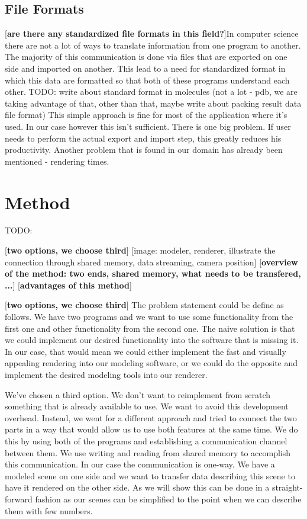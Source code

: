 \documentclass[
  digital, %
  table,   %
  nolof,     %
  nolot,     %
]{fithesis3}
\begin{document}
\section{File Formats}

[\textbf{are there any standardized file formats in this field?}]In computer science there are not a lot of ways to translate information from one program to another. The majority of this communication is done via files that are exported on one side and imported on another. This lead to a need for standardized format in which this data are formatted so that both of these programs understand each other. TODO: write about standard format in molecules (not a lot - pdb, we are taking advantage of that, other than that, maybe write about packing result data file format) This simple approach is fine for most of the application where it's used. In our case however this isn't sufficient. There is one big problem. If user needs to perform the actual export and import step, this greatly reduces his productivity. Another problem that is found in our domain has already been mentioned - rendering times.

\chapter{Method}
TODO:

[\textbf{two options, we choose third}]
[image: modeler, renderer, illustrate the connection through shared memory, data streaming, camera position]
[\textbf{overview of the method: two ends, shared memory, what needs to be transfered, ...}]
[\textbf{advantages of this method}]

[\textbf{two options, we choose third}]
The problem statement could be define as follows. We have two programs and we want to use some functionality from the first one and other functionality from the second one. The naive solution is that we could implement our desired functionality into the software that is missing it. In our case, that would mean we could either implement the fast and visually appealing rendering into our modeling software, or we could do the opposite and implement the desired modeling tools into our renderer.

We've chosen a third option. We don't want to reimplement from scratch something that is already available to use. We want to avoid this development overhead. Instead, we went for a different approach and tried to connect the two parts in a way that would allow us to use both features at the same time. We do this by using both of the programs and establishing a communication channel between them. We use writing and reading from shared memory to accomplish this communication. In our case the communication is one-way. We have a modeled scene on one side and we want to transfer data describing this scene to have it rendered on the other side. As we will show this can be done in a straight-forward fashion as our scenes can be simplified to the point when we can describe them with few numbers.
\end{document}

